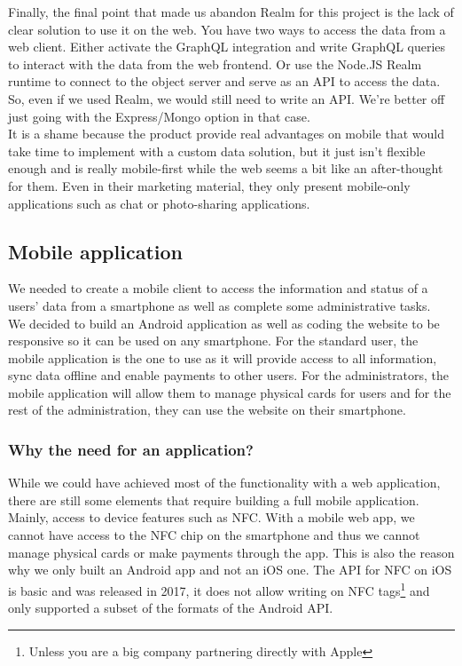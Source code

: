 \documentclass[11pt,a4paper]{report}
\begin{document}
Finally, the final point that made us abandon Realm for this project is the lack of clear solution to use it on the web. You have two ways to access the data from a web client. Either activate the GraphQL integration and write GraphQL queries to interact with the data from the web frontend. Or use the Node.JS Realm runtime to connect to the object server and serve as an API to access the data. So, even if we used Realm, we would still need to write an API. We're better off just going with the Express/Mongo option in that case. \\

It is a shame because the product provide real advantages on mobile that would take time to implement with a custom data solution, but it just isn't flexible enough and is really mobile-first while the web seems a bit like an after-thought for them. Even in their marketing material, they only present mobile-only applications such as chat or photo-sharing applications.

\subsection{Mobile application}
We needed to create a mobile client to access the information and status of a users' data from a smartphone as well as complete some administrative tasks. \\

We decided to build an Android application as well as coding the website to be responsive so it can be used on any smartphone. For the standard user, the mobile application is the one to use as it will provide access to all information, sync data offline and enable payments to other users. For the administrators, the mobile application will allow them to manage physical cards for users and for the rest of the administration, they can use the website on their smartphone.
\subsubsection{Why the need for an application?}
While we could have achieved most of the functionality with a web application, there are still some elements that require building a full mobile application. Mainly, access to device features such as NFC. With a mobile web app, we cannot have access to the NFC chip on the smartphone and thus we cannot manage physical cards or make payments through the app. This is also the reason why we only built an Android app and not an iOS one. The API for NFC on iOS\cite{apple:ios:nfc} is basic and was released in 2017, it does not allow writing on NFC tags\footnote{Unless you are a big company partnering directly with Apple} and only supported a subset of the formats of the Android API.\\
\end{document}
